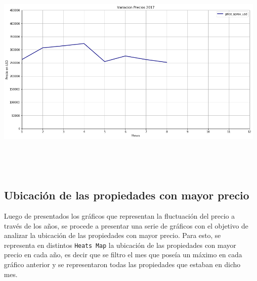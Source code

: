 \documentclass[a4paper, 10pt]{article}
\def\code#1{\texttt{#1}}
\newcommand\tab[1][0.5cm]{\hspace*{#1}}
\begin{document}
        \begin{center}
       				\includegraphics[width=6in, height=4.2in]{images/variacion2017}
		   	\end{center}

      \subsection{Ubicación de las propiedades con mayor precio}

        \tab Luego de presentados los gráficos que representan la fluctuación del precio a través de los años, se procede a presentar una serie de gráficos con el objetivo de analizar la ubicación de las propiedades con mayor precio.
        Para esto, se representa en distintos \code{Heats Map} la ubicación de las propiedades con mayor precio en cada año, es decir que se filtro el mes que poseía un máximo en cada gráfico anterior y se representaron todas las propiedades que estaban en dicho mes.
\end{document}
